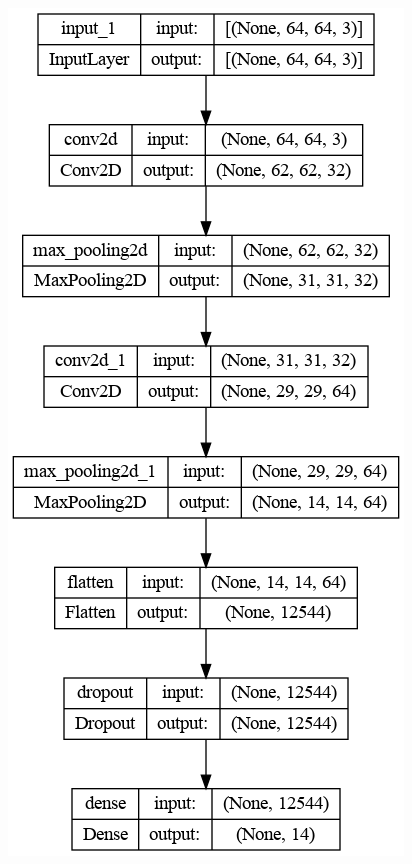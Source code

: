 \begin{figure}[h!] 
	\center
	\includegraphics [scale=0.3] {my_folder/images/model_bond}

\end{figure}
